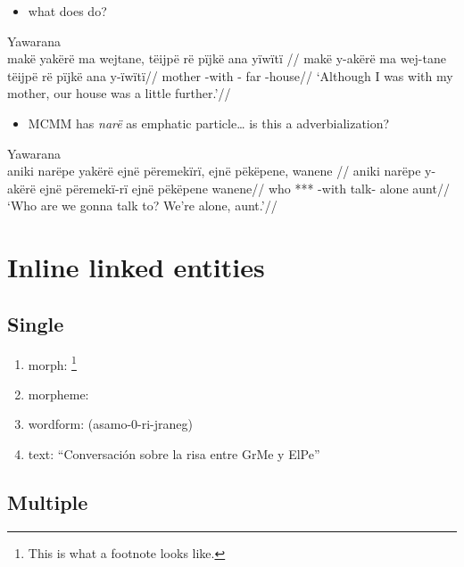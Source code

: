 \documentclass{memoir}
\begin{document}
\begin{itemize}
\tightlist
\item
  what does  do?
\end{itemize}

\ex Yawarana \\
\label{anfoperso-52}    \begingl
    \glpreamble  makë yakërë ma wejtane, tëijpë rë pïjkë ana yïwïtï //
    \gla makë y-akërë ma wej-tane tëijpë rë pïjkë ana y-ïwïtï//
    \glb mother -with  - far    -house//
        \glft ‘Although I was with my mother, our house was a little further.’//  
    \endgl 
\xe

\begin{itemize}
\tightlist
\item
  MCMM has \emph{narë} as emphatic particle\ldots{} is this a
  adverbialization?
\end{itemize}

\ex Yawarana \\
\label{convrisamaj-47}    \begingl
    \glpreamble  aniki narëpe yakërë ejnë përemekïrï, ejnë pëkëpene, wanene //
    \gla aniki narëpe y-akërë ejnë përemekï-rï ejnë pëkëpene wanene//
    \glb who *** -with  talk-  alone aunt//
        \glft ‘Who are we gonna talk to? We’re alone, aunt.’//  
    \endgl 
\xe

\section{Inline linked entities}

\subsection{Single}

\begin{enumerate}
\def\labelenumi{\arabic{enumi}.}
\tightlist
\item
  morph: \footnote{This is what a footnote looks like.}
\item
  morpheme: 
\item
  wordform: (asamo-0-ri-jraneg)
\item
  text: ``Conversación sobre la risa entre GrMe y ElPe''
\end{enumerate}

\subsection{Multiple}
\end{document}
